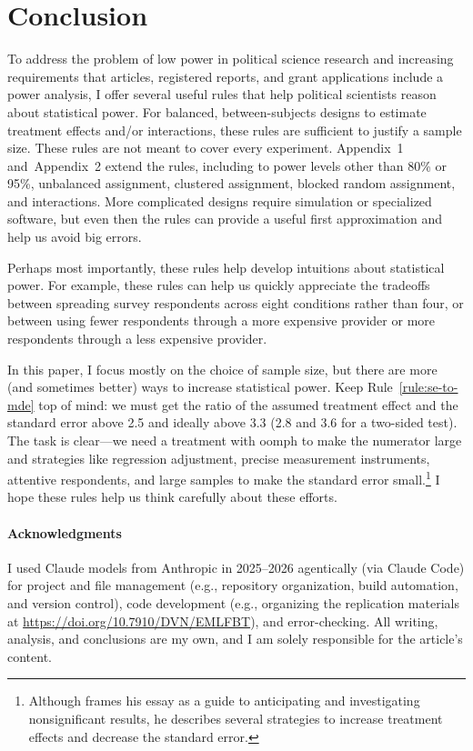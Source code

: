 \documentclass[12pt]{article}
\begin{document}
\section*{Conclusion}

To address the problem of low power in political science research \citep{ArelBundock2022} and increasing requirements that articles, registered reports, and grant applications include a power analysis, I offer several useful rules that help political scientists reason about statistical power.
For balanced, between-subjects designs to estimate treatment effects and/or interactions, these rules are sufficient to justify a sample size.
These rules are not meant to cover every experiment.
Appendix~1 and~Appendix~2 extend the rules, including to power levels other than 80\% or 95\%, unbalanced assignment, clustered assignment, blocked random assignment, and interactions.
More complicated designs require simulation or specialized software, but even then the rules can provide a useful first approximation and help us avoid big errors.

Perhaps most importantly, these rules help develop intuitions about statistical power.
For example, these rules can help us quickly appreciate the tradeoffs between spreading survey respondents across eight conditions rather than four, or between using fewer respondents through a more expensive provider or more respondents through a less expensive provider.

In this paper, I focus mostly on the choice of sample size, but there are more (and sometimes better) ways to increase statistical power.
Keep Rule~\ref{rule:se-to-mde} top of mind: we must get the ratio of the assumed treatment effect and the standard error above 2.5 and ideally above 3.3 (2.8 and 3.6 for a two-sided test).
The task is clear---we need a treatment with oomph to make the numerator large and strategies like regression adjustment, precise measurement instruments, attentive respondents, and large samples to make the standard error small.\footnote{
  Although \citet{Kane2025} frames his essay as a guide to anticipating and investigating nonsignificant results, he describes several strategies to increase treatment effects and decrease the standard error.
  }
I hope these rules help us think carefully about these efforts.


\paragraph{Acknowledgments}
I used Claude models from Anthropic in 2025--2026 agentically (via Claude Code) for project and file management (e.g., repository organization, build automation, and version control), code development (e.g., organizing the replication materials at \url{https://doi.org/10.7910/DVN/EMLFBT}), and error-checking. All writing, analysis, and conclusions are my own, and I am solely responsible for the article's content.
\end{document}
